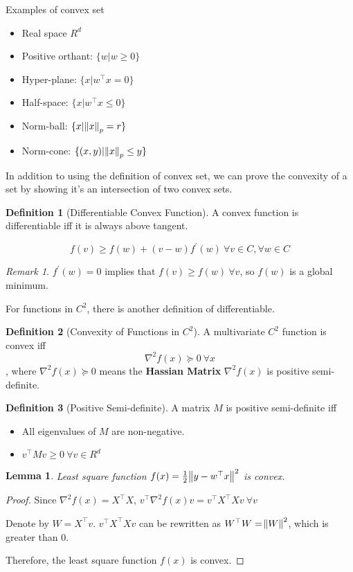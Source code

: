 \documentclass{article}
\newtheorem{lemma}{Lemma}
\theoremstyle{definition}
\newtheorem{definition}{Definition}[section]
\theoremstyle{remark}
\newtheorem*{remark}{Remark}
\newcommand{\rmk}[1]{\begin{remark}#1\end{remark}}
\begin{document}
Examples of convex set
\begin{itemize}
    \item Real space $R^{d}$
    \item Positive orthant: $\{w|w \geq 0\}$
    \item Hyper-plane: $\{x|w^{\top}x = 0\}$
    \item Half-space: $\{x|w^{\top}x \leq 0\}$
    \item Norm-ball: $\{x|\norm{x}_{p} = r\}$
    \item Norm-cone: $\{(x, y)|\norm{x}_{p} \leq y\}$
\end{itemize}

In addition to using the definition of convex set, we can prove the convexity of a set by showing it's an intersection of two convex sets.

\begin{definition}[Differentiable Convex Function] A convex function is differentiable iff it is always above tangent.

\begin{equation}
    f(v) \geq f(w) + (v- w)f^{'}(w)\ \forall v \in C, \forall w \in C
\end{equation}
\end{definition}

\rmk{$f^{'}(w) = 0$ implies that $f(v) \geq f(w)\ \forall v$, so $f(w)$ is a global minimum.}

For functions in $C^{2}$, there is another definition of differentiable.
\begin{definition}[Convexity of Functions in $C^{2}$]
A multivariate $C^{2}$ function is convex iff
\begin{equation}
    \nabla^{2}f(x) \succeq 0\ \forall x
\end{equation}, where $\nabla^{2}f(x) \succeq 0$ means the \textbf{Hassian Matrix} $\nabla^{2}f(x)$ is positive semi-definite.
\end{definition}

\begin{definition}[Positive Semi-definite]
A matrix $M$ is positive semi-definite iff
\begin{itemize}
    \item All eigenvalues of $M$ are non-negative.
    \item $v^{\top}Mv \geq 0\ \forall v \in R^{d}$
\end{itemize}
\end{definition}

\begin{lemma}
Least square function $f(x) = \frac{1}{2}\norm{y - w^{\top}x}^2$ is convex.
\end{lemma}
\begin{proof}
Since $\nabla^{2}f(x) = X^{\top}X$, $v^{\top}\nabla^{2}f(x)v = v^{\top}X^{\top}Xv\ \forall v$

Denote by $W = X^{\top}v$. $v^{\top}X^{\top}Xv$ can be rewritten as $W^{\top}W = \norm{W}^2$, which is greater than 0.

Therefore, the least square function $f(x)$ is convex.
\end{proof}
\end{document}
